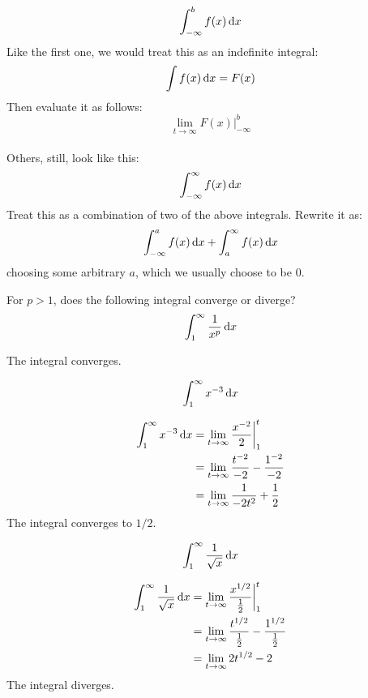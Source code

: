 \begin{equation}
  \int^{b}_{-\infty} f(x) \,\mathrm{d} x
\end{equation}
Like the first one, we would treat this as an indefinite integral:
\[ \int f(x) \,\mathrm{d} x = F(x) \]
Then evaluate it as follows:
\[ \lim_{t \to \infty} F(x)\bigg|^{b}_{-\infty} \] \\

Others, still, look like this:
\begin{equation}
  \int^{\infty}_{-\infty} f(x) \,\mathrm{d} x
\end{equation}
Treat this as a combination of two of the above integrals. Rewrite it as:
\[ \int^{a}_{-\infty} f(x) \,\mathrm{d} x
    + \int^{\infty}_{a} f(x) \,\mathrm{d} x \]
choosing some arbitrary \(a\), which we usually choose to be \(0\).

\begin{ex}
    For $p>1$, does the following integral converge or diverge?
    \[ \int^\infty_1 \frac{1}{x^p} \,\mathrm{d} x \]
    \begin{sol}
      The integral converges.
    \end{sol}
  \end{ex}
\begin{ex}
	\[ \int^{\infty}_1 x^{-3} \,\mathrm{d} x \]
	\begin{sol}
	\begin{align*}
		\int^{\infty}_1 x^{-3} \,\mathrm{d} x &=\lim_{t \to \infty} \frac{x^{-2}}{2}\bigg|^{t}_{1} \\
		  &=\lim_{t \to \infty} \frac{t^{-2}}{-2}-\frac{1^{-2}}{-2} \\
		  &=\lim_{t \to \infty} \frac{1}{-2t^2}+\frac{1}{2}
	\end{align*}
The integral converges to $1/2$.
\end{sol}
\end{ex}
\begin{ex}
	\[ \int^\infty_1 \frac{1}{\sqrt{x}}\,\mathrm{d} x \]
	\begin{sol}
	\begin{align*}
		\int^\infty_1 \frac{1}{\sqrt{x}}\,\mathrm{d} x &=\lim_{t \to \infty} \frac{x^{1/2}}{\frac{1}{2}}\bigg|^t_1 \\
		&=\lim_{t \to \infty} \frac{t^{1/2}}{\frac{1}{2}}-\frac{1^{1/2}}{\frac{1}{2}} \\
		&=\lim_{t \to \infty} 2t^{1/2}-2
	\end{align*}
The integral diverges.
\end{sol}
\end{ex}
